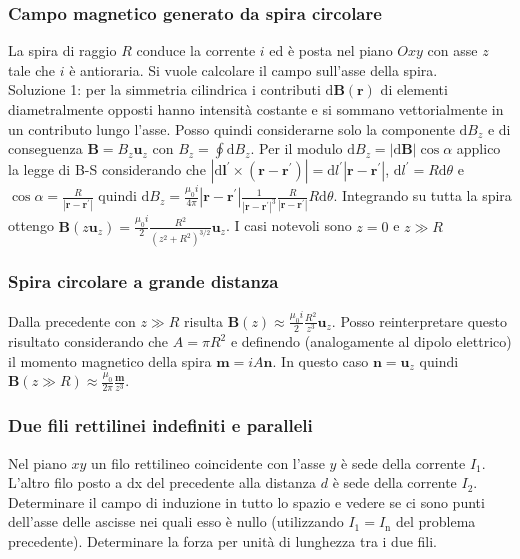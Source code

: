 \documentclass[11pt,a4paper]{article}
\newcommand{\de}{\mathrm d}
\begin{document}
\subsubsection{Campo magnetico generato da spira circolare}
La spira di  raggio $R$ conduce la corrente $i$ ed è posta nel piano $Oxy$ con asse $z$ tale che $i$ è antioraria. Si vuole calcolare il campo sull'asse della spira.\\
Soluzione 1: per la simmetria cilindrica i contributi $\de\mathbf B(\mathbf r)$ di elementi diametralmente opposti hanno intensità costante e si sommano vettorialmente in un contributo lungo l'asse. Posso quindi considerarne solo la componente $\de B_z$ e di conseguenza $\mathbf B = B_z \mathbf u_z$ con $B_z = \oint \de B_z$. Per il modulo $\de B_z = |\de\mathbf B| \cos\alpha$ applico la legge di B-S considerando che $|\de\mathbf l^\prime \times (\mathbf r - \mathbf r^\prime)| = \de l^\prime |\mathbf r - \mathbf r^\prime|$, $\de l^\prime = R\de\theta$ e $\cos\alpha = \frac{R}{|\mathbf r - \mathbf r^\prime|}$ quindi $\de B_z = \frac{\mu_0 i}{4\pi} |\mathbf r - \mathbf r^\prime| \frac1{|\mathbf r - \mathbf r^\prime|^3} \frac{R}{|\mathbf r - \mathbf r^\prime|} R\de\theta$. Integrando su tutta la spira ottengo $\mathbf B(z\mathbf u_z) = \frac{\mu_0 i}{2} \frac{R^2}{(z^2 + R^2)^{3/2}} \mathbf u_z$. I casi notevoli sono $z = 0$ e $z \gg R$

\subsubsection{Spira circolare a grande distanza}
Dalla precedente con $z \gg R$ risulta $\mathbf B(z) \approx \frac{\mu_0 i}{2} \frac{R^2}{z^3} \mathbf u_z$. Posso reinterpretare questo risultato considerando che $A = \pi R^2$ e definendo (analogamente al dipolo elettrico) il momento magnetico della spira $\mathbf m = i A \mathbf n$. In questo caso $\mathbf n = \mathbf u_z$ quindi $\mathbf B(z \gg R) \approx \frac{\mu_0}{2\pi} \frac{\mathbf m}{z^3}$.

\subsubsection{Due fili rettilinei indefiniti e paralleli}
Nel piano $xy$ un filo rettilineo coincidente con l'asse $y$ è sede della corrente $I_1$. L'altro filo posto a dx del precedente alla distanza $d$ è sede della corrente $I_2$. Determinare il campo di induzione in tutto lo spazio e vedere se ci sono punti dell'asse delle ascisse nei quali esso è nullo (utilizzando $I_1=I_\mathrm n$ del problema precedente). Determinare la forza per unità di lunghezza tra i due fili.
\end{document}
